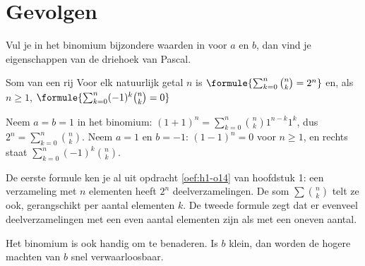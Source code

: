 \section{Gevolgen}

Vul je in het binomium bijzondere waarden in voor $a$ en $b$, dan vind je eigenschappen van de driehoek van Pascal.

\begin{theorie}
\begin{stelling}{Som van een rij}
Voor elk natuurlijk getal $n$ is \quad $\formule{\sum_{k=0}^{n} \binom{n}{k} = 2^n}$ \quad en, als $n \geqslant 1$, \quad $\formule{\sum_{k=0}^{n} (-1)^k \binom{n}{k} = 0}$
\end{stelling}

\begin{bewijs}
Neem $a = b = 1$ in het binomium: $(1 + 1)^n = \sum_{k=0}^{n} \binom{n}{k} 1^{n - k} 1^k$, dus $2^n = \sum_{k=0}^n \binom{n}{k}$. Neem $a = 1$ en $b = -1$: $(1 - 1)^n = 0$ voor $n \geqslant 1$, en rechts staat $\sum_{k=0}^{n} (-1)^k \binom{n}{k}$.
\end{bewijs}
\end{theorie}

De eerste formule ken je al uit opdracht \ref{oef:h1-o14} van hoofdstuk 1: een verzameling met $n$ elementen heeft $2^n$ deelverzamelingen. De som $\sum \binom{n}{k}$ telt ze ook, gerangschikt per aantal elementen $k$. De tweede formule zegt dat er evenveel deelverzamelingen met een even aantal elementen zijn als met een oneven aantal.

\begin{oefeningen}
\end{oefeningen}

Het binomium is ook handig om te benaderen. Is $b$ klein, dan worden de hogere machten van $b$ snel verwaarloosbaar.


